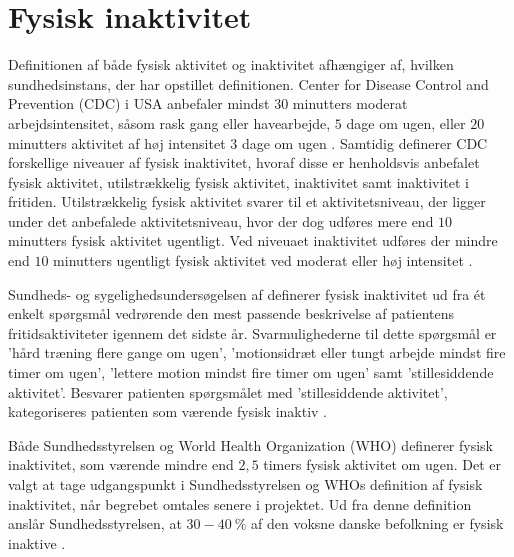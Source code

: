 \section{Fysisk inaktivitet} \label{sec:fys_inaktivitet}

Definitionen af både fysisk aktivitet og inaktivitet afhængiger af, hvilken sundhedsinstans, der har opstillet definitionen. Center for Disease Control and Prevention (CDC) i USA anbefaler mindst $30$ minutters moderat arbejdsintensitet, såsom rask gang eller havearbejde, $5$ dage om ugen, eller $20$ minutters aktivitet af høj intensitet $3$ dage om ugen \citep{motionsraad2007,christensen2012}.
Samtidig definerer CDC forskellige niveauer af fysisk inaktivitet, hvoraf disse er henholdsvis anbefalet fysisk aktivitet, utilstrækkelig fysisk aktivitet, inaktivitet samt inaktivitet i fritiden. Utilstrækkelig fysisk aktivitet svarer til et aktivitetsniveau, der ligger under det anbefalede aktivitetsniveau, hvor der dog udføres mere end $10$ minutters fysisk aktivitet ugentligt. Ved niveuaet inaktivitet udføres der mindre end $10$ minutters ugentligt fysisk aktivitet ved moderat eller høj intensitet \citep{motionsraad2007,christensen2012}.

Sundheds- og sygelighedsundersøgelsen af \citeauthor{christensen2012} definerer fysisk inaktivitet ud fra ét enkelt spørgsmål vedrørende den mest passende beskrivelse af patientens fritidsaktiviteter igennem det sidste år. Svarmulighederne til dette spørgsmål er 'hård træning flere gange om ugen', 'motionsidræt eller tungt arbejde mindst fire timer om ugen', 'lettere motion mindst fire timer om ugen' samt 'stillesiddende aktivitet'. Besvarer patienten spørgsmålet med 'stillesiddende aktivitet', kategoriseres patienten som værende fysisk inaktiv \citep{motionsraad2007,christensen2012}.

Både Sundhedsstyrelsen og World Health Organization (WHO) definerer fysisk inaktivitet, som værende mindre end $2,5$ timers fysisk aktivitet om ugen. Det er valgt at tage udgangspunkt i Sundhedsstyrelsen og WHOs definition af fysisk inaktivitet, når begrebet omtales senere i projektet. Ud fra denne definition anslår Sundhedsstyrelsen, at $30-40~\%$ af den voksne danske befolkning er fysisk inaktive \citep{motionsraad2007}. 